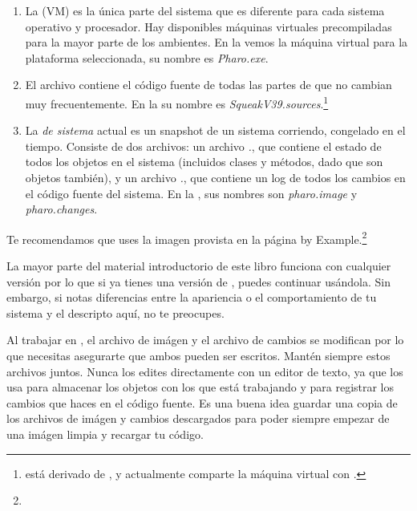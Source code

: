 \documentclass[a4paper,10pt,twoside]{book}
\begin{document}
\begin{enumerate}

  \item La  (VM) es la \'unica parte del sistema que es diferente para cada sistema operativo y procesador. Hay disponibles m\'aquinas virtuales precompiladas para la mayor parte de los ambientes. En la  vemos la m\'aquina virtual para la plataforma seleccionada, su nombre es \textit{Pharo.exe}.

  \item El archivo  contiene el c\'odigo fuente de todas las partes de \pharo que no cambian muy frecuentemente. En la  su nombre es \emph{SqueakV39.sources}.\footnote{\pharo est\'a derivado de , y actualmente comparte la m\'aquina virtual con \squeak.}

  \item La \emph{ de sistema} actual es un snapshot de un sistema \pharo corriendo, congelado en el tiempo. Consiste de dos archivos: un archivo  \emph{.}, que contiene el estado de todos los objetos en el sistema (incluidos clases y m\'etodos, dado que son objetos tambi\'en), y un archivo \emph{.}, que contiene un log de todos los cambios en el c\'odigo fuente del sistema.
En la , sus nombres son \emph{pharo.image} y \emph{pharo.changes}.
\end{enumerate}

Te recomendamos que uses la imagen provista en la p\'agina \pharo by Example.\footnote{\pbe}

La mayor parte del material introductorio de este libro funciona con cualquier versi\'on por lo que si ya tienes una versi\'on de \pharo, puedes continuar us\'andola.
Sin embargo, si notas diferencias entre la apariencia o el comportamiento de tu sistema y el descripto aqu\'i, no te preocupes.

Al trabajar en \pharo, el archivo de im\'agen y el archivo de cambios se modifican por lo que necesitas asegurarte que ambos pueden ser escritos.
Mant\'en siempre estos archivos juntos.
Nunca los edites directamente con un editor de texto, ya que \pharo los usa para almacenar los objetos con los que est\'a trabajando y para registrar los cambios que haces en el c\'odigo fuente.
Es una buena idea guardar una copia de los archivos de im\'agen y cambios descargados para poder siempre empezar de una im\'agen limpia y recargar tu c\'odigo.
\end{document}
